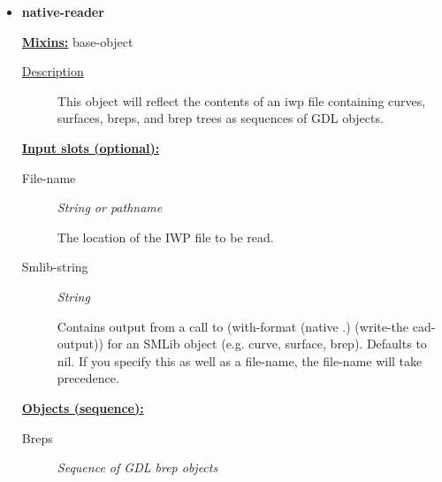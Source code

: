 \documentclass [11pt]{book}
\begin{document}
\begin{itemize}
\begin{description}
\end{description}







\item {}
\label{prim:native-reader}
\textbf{native-reader}


\textbf{
\underline{Mixins:}} base-object





\begin{description}

\item [
\underline{Description}]


This object will reflect the contents of an iwp file containing
curves, surfaces, breps, and brep trees as sequences of GDL objects. 




\end{description}








\textbf{
\underline{Input slots (optional):}}

\begin{description}

\item [File-name]
\emph{String or pathname}

 The location of the IWP file to be read.




\item [Smlib-string]
\emph{String}

 Contains output from a call to (with-format (native .) (write-the cad-output))
for an SMLib object (e.g. curve, surface, brep). Defaults to nil. If you specify this as well as a
file-name, the file-name will take precedence.




\end{description}






\textbf{
\underline{Objects (sequence):}}

\begin{description}

\item [Breps]
\emph{Sequence of GDL brep objects}


\end{description}
\end{itemize}
\end{document}
